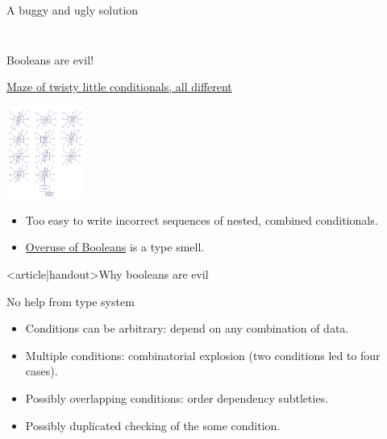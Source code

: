 \begin{frame}[fragile]{A buggy and ugly solution}
  \inputminted[gobble=2]{scala}{FizzBuzzIf.scala}

  \inputminted{console}{testQuick3.console}
\end{frame}

\begin{frame}{Booleans are evil!}
\begin{block}{\href{http://en.wikiquote.org/wiki/Colossal\_Cave\_Adventure}{Maze of twisty little conditionals, all different}}
  \begin{center}
    \includegraphics[height=3cm]{dmaze.png}
  \end{center}

  \begin{itemize}
  \item Too easy to write incorrect sequences of nested, combined conditionals.
  \item \href{http://existentialtype.wordpress.com/2011/03/15/boolean-blindness/}{Overuse of Booleans} is a type \alert{smell}.
  \end{itemize}
  \end{block}
\end{frame}

\begin{frame}<article|handout>{Why booleans are evil}
  \begin{block}{No help from type system}
    \begin{itemize}
    \item Conditions can be arbitrary: depend on \alert{any} combination of data.
    \item Multiple conditions: combinatorial explosion (two conditions led to four cases).
    \item Possibly overlapping conditions: order dependency subtleties.
    \item Possibly duplicated checking of the some condition.
    \end{itemize}
  \end{block}
\end{frame}

